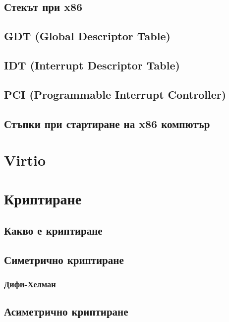   \subsection{Стекът при x86}

  \subsection{GDT (Global Descriptor Table)}

  \subsection{IDT (Interrupt Descriptor Table)}

  \subsection{PCI (Programmable Interrupt Controller)} %

  \subsection{Стъпки при стартиране на x86 компютър}

\section{Virtio}

\section{Криптиране}
  \subsection{Какво е криптиране}

  \subsection{Симетрично криптиране}
    \subsubsection{Дифи-Хелман}

  \subsection{Асиметрично криптиране}

